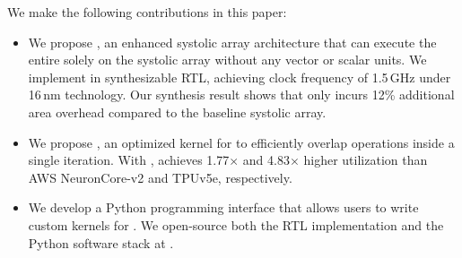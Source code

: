 We make the following contributions in this paper:
\begin{itemize}
    \item
    We propose \MSAGA{}, an enhanced systolic array architecture that can execute the
    entire \FA{} solely on the systolic array without any vector or scalar units.
    We implement \MSAGA{} in synthesizable RTL, achieving clock frequency of 1.5\,GHz
    under 16\,nm technology.
    Our synthesis result shows that \MSAGA{} only incurs 12\% additional area overhead
    compared to the baseline systolic array.

    \item 
    We propose \SA{}, an optimized kernel for \MSAGA{} to efficiently overlap operations inside a single \FA{} iteration.
    With \SA{}, \MSAGA{} achieves 1.77$\times$ and 4.83$\times$ higher \FLOPs{} utilization
    than AWS NeuronCore-v2 and TPUv5e, respectively.

    \item
    We develop a Python programming interface that allows users to write custom kernels for \MSAGA{}.
    We open-source both the RTL implementation and the Python software stack at \MSAGAURL{}.
\end{itemize}

